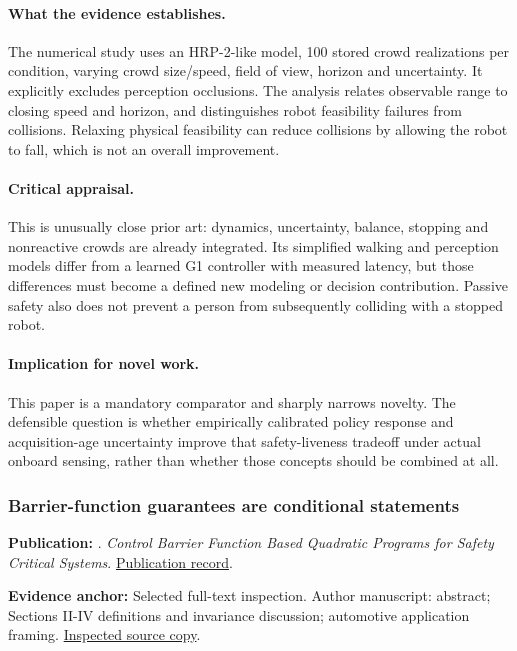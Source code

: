 \paragraph{What the evidence establishes.} The numerical study uses an HRP-2-like model, 100 stored crowd realizations per condition, varying crowd size/speed, field of view, horizon and uncertainty. It explicitly excludes perception occlusions. The analysis relates observable range to closing speed and horizon, and distinguishes robot feasibility failures from collisions. Relaxing physical feasibility can reduce collisions by allowing the robot to fall, which is not an overall improvement.

\paragraph{Critical appraisal.} This is unusually close prior art: dynamics, uncertainty, balance, stopping and nonreactive crowds are already integrated. Its simplified walking and perception models differ from a learned G1 controller with measured latency, but those differences must become a defined new modeling or decision contribution. Passive safety also does not prevent a person from subsequently colliding with a stopped robot.

\paragraph{Implication for novel work.} This paper is a mandatory comparator and sharply narrows novelty. The defensible question is whether empirically calibrated policy response and acquisition-age uncertainty improve that safety-liveness tradeoff under actual onboard sensing, rather than whether those concepts should be combined at all.

\subsubsection{Barrier-function guarantees are conditional statements}\label{paper:cbf}
\textbf{Publication:} \citet{cbf}. \emph{Control Barrier Function Based Quadratic Programs for Safety Critical Systems}. \href{https://doi.org/10.1109/tac.2016.2638961}{Publication record}.

\textbf{Evidence anchor:} Selected full-text inspection. Author manuscript: abstract; Sections II-IV definitions and invariance discussion; automotive application framing. \href{https://arxiv.org/pdf/1609.06408}{Inspected source copy}.

